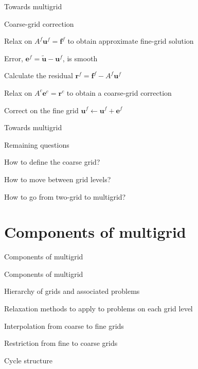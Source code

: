\documentclass[18pt,xcolor=table]{beamer}
\begin{document}
\begin{frame}{Towards multigrid}
\begin{block}{Coarse-grid correction}
\bit
\item Relax on $A^f\mathbf{u}^f = \mathbf{f}^f$ to obtain approximate fine-grid solution
\item Error, $\mathbf{e}^f = \mathbf{\tilde u} - \mathbf{u}^f$, is smooth
\item Calculate the residual $\mathbf{r}^f = \mathbf{f}^f - A^f\mathbf{u}^f$
\item Relax on $A^c\mathbf{e}^c = \mathbf{r}^c$ to obtain a coarse-grid correction
\item Correct on the fine grid $\mathbf{u}^f \leftarrow \mathbf{u}^f + \mathbf{e}^f$
\eit
\end{block}
\end{frame}

\begin{frame}{Towards multigrid}
\begin{block}{Remaining questions}
\bit
\item How to define the coarse grid?
\item How to move between grid levels?
\item How to go from two-grid to multigrid?
\eit
\end{block}
\end{frame}


\section{Components of multigrid}

\begin{frame}{Components of multigrid}
\begin{block}{Components of multigrid}
\bit
\item Hierarchy of grids and associated problems
\item Relaxation methods to apply to problems on each grid level
\item Interpolation from coarse to fine grids
\item Restriction from fine to coarse grids
\item Cycle structure
\eit
\end{block}
\end{frame}
\end{document}
